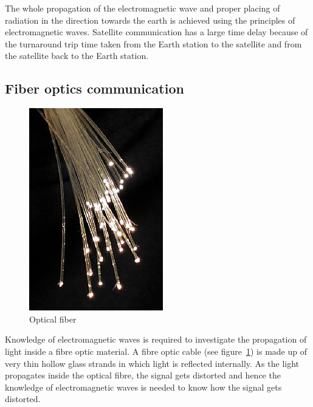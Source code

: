 The whole propagation of the electromagnetic wave and proper placing of radiation in the direction towards the earth is achieved using the principles of electromagnetic waves. Satellite communication has a large time delay because of the turnaround trip time taken from the Earth station to the satellite and from the satellite back to the Earth station.

\subsection{Fiber optics communication}
\begin{figure}[h]
\centering
\includegraphics[scale=0.4]{./graphics/opticalfiber1}
\caption{Optical fiber}
\label{fig:opticalfibre1}
\end{figure}

Knowledge of electromagnetic waves is required to investigate the propagation of light inside a fibre optic material. A fibre optic cable (see figure~\ref{fig:opticalfibre1}) is made up of very thin hollow glass strands in which light is reflected internally. As the light propagates inside the optical fibre, the signal gets distorted and hence the knowledge of electromagnetic waves is needed to know how the signal gets distorted.

